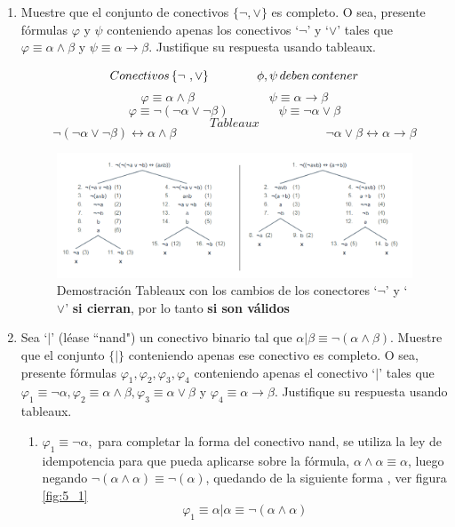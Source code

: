 \documentclass{article}
\begin{document}
\begin{enumerate}
		
		\item Muestre que el conjunto de conectivos $\{\neg,\lor\}$ es completo. O sea, presente fórmulas $\varphi$ y $\psi$ conteniendo apenas los conectivos `$\neg$' y `$\lor$' tales que $\varphi \equiv \alpha \land \beta$ y $\psi \equiv \alpha \to \beta$. Justifique su respuesta usando tableaux.
		
		 \[ Conectivos \thinspace \{\neg \ , \lor \} \quad \quad \quad \quad \phi , \psi \thinspace deben \thinspace contener \]
		        \[ \varphi \equiv \alpha \land \beta  \qquad \qquad \qquad  \psi \equiv \alpha \to \beta \]
		        \[ \varphi \equiv \neg ( \neg \alpha \lor \neg \beta )  \qquad \qquad \psi \equiv \neg \alpha \lor \beta  \]
		          \[ \]
		        \[ Tableaux \]
		        \[ \neg ( \neg \alpha \lor \neg \beta ) \leftrightarrow \alpha \land \beta 
		        \qquad  \qquad  \qquad  \qquad  \qquad  \qquad 
		         \neg \alpha \lor \beta \leftrightarrow \alpha \to \beta \]
		         
		         \begin{figure}[H]
        			\centering
        			\includegraphics[scale=0.60]{img/ejercicio_04.png}
        			\caption{Demostración Tableaux con los cambios de los conectores `$\neg$' y `$\lor$' \textbf{si cierran}, por lo tanto \textbf{si son válidos}}
        			\label{fig:4_1}
        		\end{figure}
		
		\item Sea `$|$' (léase ``nand") un conectivo binario tal que $\alpha | \beta \equiv \neg(\alpha \land \beta)$. Muestre que el conjunto $\{|\}$ conteniendo apenas ese conectivo es completo. O sea, presente fórmulas $\varphi_1, \varphi_2, \varphi_3, \varphi_4$ conteniendo apenas el conectivo `$|$' tales que $\varphi_1 \equiv \neg\alpha, \varphi_2 \equiv \alpha\land\beta, \varphi_3 \equiv \alpha\lor\beta$ y $\varphi_4 \equiv \alpha \to \beta$. Justifique su respuesta usando tableaux.
		
		\begin{enumerate}
		    \item $\varphi_1 \equiv \neg\alpha,$ para completar la forma del conectivo nand, se utiliza la ley de idempotencia para que pueda aplicarse sobre la fórmula, $\alpha \land \alpha \equiv \alpha$, luego negando $\neg(\alpha \land \alpha) \equiv \neg(\alpha)$, quedando de la siguiente forma , ver figura \ref{fig:5_1}
		    \begin{equation}
		        \varphi_1 \equiv \alpha | \alpha \equiv \neg (\alpha \land \alpha)
		    \end{equation}
		    

\end{enumerate}
\end{enumerate}
\end{document}
